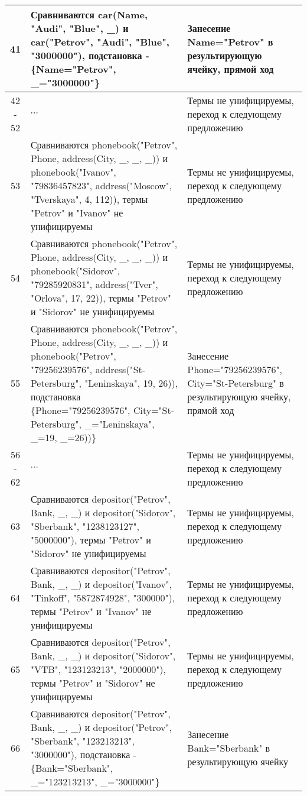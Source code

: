 \documentclass[a4paper,12pt]{article}
\begin{document}
\newpage
\begin{table}[ht!] 
	\begin{tabularx}{\linewidth}{|c|>{\centering}X|>{\centering}X|}
		\hline
		41 & Сравниваются car(Name, "Audi"{}, "Blue"{}, \_) и car("Petrov"{}, "Audi"{}, "Blue"{}, "3000000"), подстановка - \{Name="Petrov"{}, \_="3000000"\} & Занесение Name="Petrov" в результирующую ячейку, прямой ход \tabularnewline
		\hline
		42 - 52  & $\cdots$ & Термы не унифицируемы, переход к следующему предложению \tabularnewline
		\hline
		53 & Сравниваются phonebook("Petrov"{}, Phone, address(City, \_, \_, \_)) и phonebook("Ivanov"{}, "79836457823"{}, address("Moscow"{}, "Tverskaya"{}, 4, 112)), термы "Petrov"{} и "Ivanov"{} не унифицируемы & Термы не унифицируемы, переход к следующему предложению \tabularnewline
		\hline
		54 & Сравниваются phonebook("Petrov"{}, Phone, address(City, \_, \_, \_)) и phonebook("Sidorov"{}, "79285920831"{}, address("Tver"{}, "Orlova"{}, 17, 22)), термы "Petrov"{} и "Sidorov"{} не унифицируемы & Термы не унифицируемы, переход к следующему предложению \tabularnewline
		\hline
		55 & Сравниваются phonebook("Petrov"{}, Phone, address(City, \_, \_, \_)) и phonebook("Petrov"{}, "79256239576"{}, address("St-Petersburg"{}, "Leninskaya"{}, 19, 26)), подстановка \{Phone="79256239576"{}, City="St-Petersburg"{}, \_="Leninskaya"{}, \_=19, \_=26))\} & Занесение Phone="79256239576"{}, City="St-Petersburg"{} в результирующую ячейку, прямой ход \tabularnewline
		\hline
		56 - 62  & $\cdots$ & Термы не унифицируемы, переход к следующему предложению \tabularnewline
		\hline
		63 & Сравниваются depositor("Petrov"{}, Bank, \_, \_) и depositor("Sidorov"{}, "Sberbank"{}, "1238123127"{}, "5000000"), термы "Petrov"{} и "Sidorov"{} не унифицируемы & Термы не унифицируемы, переход к следующему предложению \tabularnewline
		\hline
		64 & Сравниваются depositor("Petrov"{}, Bank, \_, \_) и depositor("Ivanov"{}, "Tinkoff"{}, "5872874928"{}, "300000"), термы "Petrov"{} и "Ivanov"{} не унифицируемы & Термы не унифицируемы, переход к следующему предложению \tabularnewline
		\hline
		65 & Сравниваются depositor("Petrov"{}, Bank, \_, \_) и depositor("Sidorov"{}, "VTB"{}, "123123213"{}, "2000000"), термы "Petrov"{} и "Sidorov"{} не унифицируемы & Термы не унифицируемы, переход к следующему предложению \tabularnewline
		\hline
		66 & Сравниваются depositor("Petrov"{}, Bank, \_, \_) и depositor("Petrov"{}, "Sberbank"{}, "123213213"{}, "3000000"), подстановка - \{Bank="Sberbank"{}, \_="123213213"{}, \_="3000000"\} & Занесение Bank="Sberbank"{} в результирующую ячейку \tabularnewline
		\hline
	\end{tabularx}
\end{table}
\end{document}
